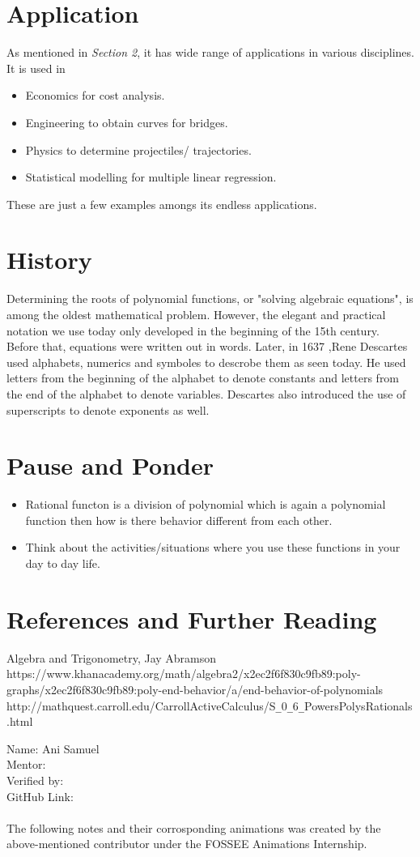 \documentclass[12pt,a4paper]{article}
\begin{document}
\section{Application}
As mentioned in \textit{Section 2}, it has wide range of applications in various disciplines. It is used in
\begin{itemize}
    \item Economics for cost analysis.
    \item Engineering to obtain curves for bridges.
    \item Physics to determine projectiles/ trajectories.
    \item Statistical modelling for multiple linear regression.
\end{itemize}

These are just a few examples amongs its endless applications.
\section{History}
Determining the roots of polynomial functions, or "solving algebraic equations", is among the oldest mathematical problem. However, the elegant and practical notation we use today only developed in the beginning of the 15th century. Before that, equations were written out in words. Later, in 1637 ,Rene Descartes used alphabets, numerics and symboles to descrobe them as seen today. He used letters from the beginning of the alphabet to denote constants and letters from the end of the alphabet to denote variables. Descartes also introduced the use of superscripts to denote exponents as well.
 
\section{Pause and Ponder}
\begin{itemize}
    \item Rational functon is a division of polynomial which is again a polynomial function then how is there behavior different from each other.
    \item Think about the activities/situations where you use these functions in your day to day life.
\end{itemize}
\section{References and  Further Reading}

\begin{thebibliography}{}
\bibitem{}Algebra and Trigonometry, Jay Abramson
\bibitem{}https://www.khanacademy.org/math/algebra2/x2ec2f6f830c9fb89:poly-graphs/x2ec2f6f830c9fb89:poly-end-behavior/a/end-behavior-of-polynomials
\bibitem{}http://mathquest.carroll.edu/CarrollActiveCalculus/S\verb|_|0\verb|_|6\verb|_|PowersPolysRationals.html
\end{thebibliography}


Name: Ani Samuel\\
Mentor: \\
Verified by:\\
GitHub Link: \\\\
The following notes and their corrosponding animations was created by the above-mentioned contributor under the FOSSEE Animations Internship.
\end{document}
